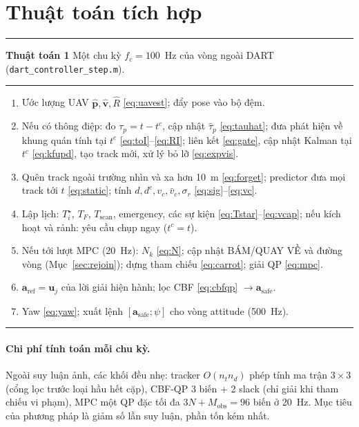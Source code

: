 \documentclass[11pt,a4paper]{article}
\numberwithin{equation}{section}
\newcommand{\vb}[1]{\bm{#1}}
\newcommand{\code}[1]{\texttt{\small #1}}
\theoremstyle{definition}
\theoremstyle{plain}
\theoremstyle{remark}
\begin{document}
\section{Thuật toán tích hợp}
\label{sec:algo}
\begin{center}
\begin{minipage}{0.95\linewidth}
\hrule\smallskip
\textbf{Thuật toán 1} Một chu kỳ $f_c=100$~Hz của vòng ngoài DART (\code{dart\_controller\_step.m}).
\smallskip\hrule\smallskip
\begin{enumerate}[leftmargin=1.6em,itemsep=2pt]
\item Ước lượng UAV $\hat{\vb p},\hat{\vb v},\hat R$ \eqref{eq:uavest}; đẩy pose vào bộ đệm.
\item Nếu có thông điệp: đo $\tau_p=t-t^c$, cập nhật $\hat\tau_p$ \eqref{eq:tauhat}; đưa phát hiện về khung quán tính tại $t^c$ \eqref{eq:toI}--\eqref{eq:RI}; liên kết \eqref{eq:gate}, cập nhật Kalman tại $t^c$ \eqref{eq:kfupd}, tạo track mới, xử lý bỏ lỡ \eqref{eq:expvis}.
\item Quên track ngoài trường nhìn và xa hơn 10~m \eqref{eq:forget}; predictor đưa mọi track tới $t$ \eqref{eq:static}; tính $d,d^c,v_c,\bar v_c,\sigma_r$ \eqref{eq:sig}--\eqref{eq:vc}.
\item Lập lịch: $T^\star_i$, $T_F$, $T_{\text{scan}}$, emergency, các sự kiện \eqref{eq:Tstar}--\eqref{eq:vcap}; nếu kích hoạt và rảnh: yêu cầu chụp ngay ($t^c=t$).
\item Nếu tới lượt MPC (20~Hz): $N_k$ \eqref{eq:N}; cập nhật BÁM/QUAY VỀ và đường vòng (Mục~\ref{sec:rejoin}); dựng tham chiếu \eqref{eq:carrot}; giải QP \eqref{eq:mpc}.
\item $\vb a_{\text{ref}}=\vb u_j$ của lời giải hiện hành; lọc CBF \eqref{eq:cbfqp} $\to\vb a_{\text{safe}}$.
\item Yaw \eqref{eq:yaw}; xuất lệnh $[\vb a_{\text{safe}};\psi]$ cho vòng attitude (500~Hz).
\end{enumerate}
\smallskip\hrule
\end{minipage}
\end{center}

\paragraph{Chi phí tính toán mỗi chu kỳ.} Ngoài suy luận ảnh, các khối đều nhẹ: tracker $O(n_tn_d)$ phép tính ma trận $3\times3$ (cổng lọc trước loại hầu hết cặp), CBF-QP 3 biến + 2 slack (chỉ giải khi tham chiếu vi phạm), MPC một QP đặc tối đa $3N+M_{\text{obs}}=96$ biến ở 20~Hz. Mục tiêu của phương pháp là giảm số lần suy luận, phần tốn kém nhất.
\end{document}
